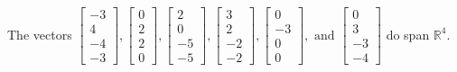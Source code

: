 \begin{exercise}
\begin{exerciseStatement}
  \end{exerciseStatement}
  \begin{exerciseAnswer}
   The vectors \(\left[\begin{array}{r}
-3 \\
4 \\
-4 \\
-3
\end{array}\right] , \left[\begin{array}{r}
0 \\
2 \\
2 \\
0
\end{array}\right] , \left[\begin{array}{r}
2 \\
0 \\
-5 \\
-5
\end{array}\right] , \left[\begin{array}{r}
3 \\
2 \\
-2 \\
-2
\end{array}\right] , \left[\begin{array}{r}
0 \\
-3 \\
0 \\
0
\end{array}\right] , \text{ and } \left[\begin{array}{r}
0 \\
3 \\
-3 \\
-4
\end{array}\right]\) 
  	 do  
	span \(\mathbb{R}^4\).
  


  \end{exerciseAnswer}
\end{exercise}